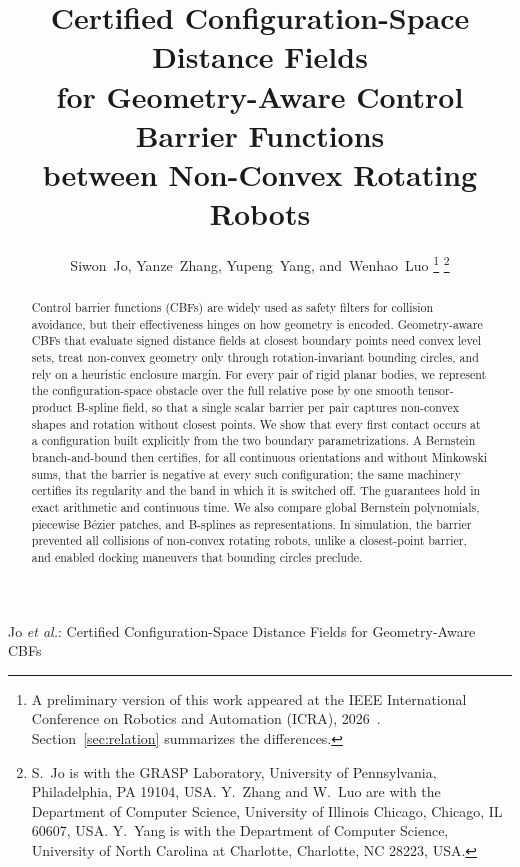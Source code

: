 \documentclass[journal]{IEEEtran}
\theoremstyle{definition}
\newif\ifanonymous
\begin{document}
\title{Certified Configuration-Space Distance Fields\\
for Geometry-Aware Control Barrier Functions\\
between Non-Convex Rotating Robots}

\ifanonymous
\author{Anonymous Authors}
\markboth{IEEE Transactions on Robotics}%
{Certified Configuration-Space Distance Fields for Geometry-Aware CBFs}
\else
\author{Siwon~Jo, Yanze~Zhang, Yupeng~Yang, and~Wenhao~Luo%
\thanks{A preliminary version of this work appeared at the IEEE International Conference on
Robotics and Automation (ICRA), 2026~\cite{jo2026geometry}. Section~\ref{sec:relation}
summarizes the differences.}%
\thanks{S.~Jo is with the GRASP Laboratory, University of Pennsylvania, Philadelphia, PA 19104,
USA. Y.~Zhang and W.~Luo are with the Department of Computer Science, University of Illinois
Chicago, Chicago, IL 60607, USA. Y.~Yang is with the Department of Computer Science, University
of North Carolina at Charlotte, Charlotte, NC 28223, USA.}}

%
{Jo \MakeLowercase{\textit{et al.}}: Certified Configuration-Space Distance Fields for Geometry-Aware CBFs}
\fi

\maketitle

\begin{abstract}
Control barrier functions (CBFs) are widely used as safety filters for collision avoidance, but
their effectiveness hinges on how geometry is encoded. Geometry-aware CBFs that evaluate signed
distance fields at closest boundary points need convex level sets, treat non-convex geometry only
through rotation-invariant bounding circles, and rely on a heuristic enclosure margin. For every
pair of rigid planar bodies, we represent the configuration-space obstacle over the full relative
pose by one smooth tensor-product B-spline field, so that a single scalar barrier per pair
captures non-convex shapes and rotation without closest points. We show that every first contact
occurs at a configuration built explicitly from the two boundary parametrizations. A Bernstein
branch-and-bound then certifies, for all continuous orientations and without Minkowski sums, that
the barrier is negative at every such configuration; the same machinery certifies its regularity
and the band in which it is switched off. The guarantees hold in exact arithmetic and continuous
time. We also compare global Bernstein polynomials, piecewise B\'ezier patches, and B-splines as
representations. In simulation, the barrier prevented all collisions of non-convex rotating
robots, unlike a closest-point barrier, and enabled docking maneuvers that bounding circles
preclude.
\end{abstract}
\end{document}
